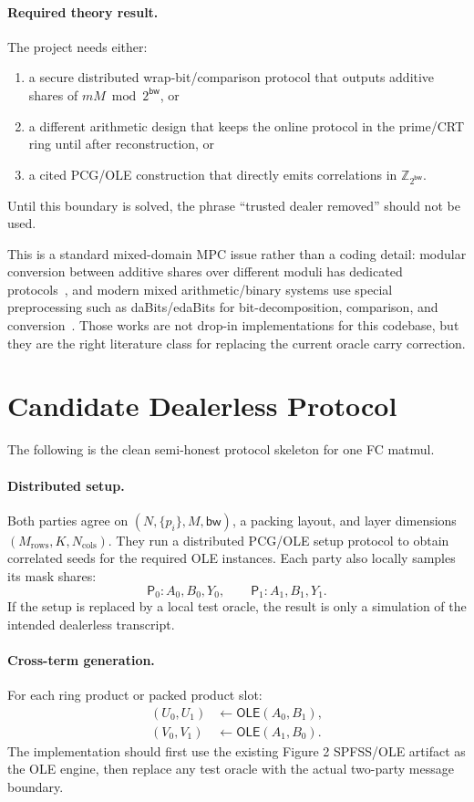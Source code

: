 \documentclass[11pt]{article}
\newcommand{\Z}{\mathbb{Z}}
\newcommand{\ServerZero}{\mathsf{P}_0}
\newcommand{\ServerOne}{\mathsf{P}_1}
\newcommand{\modtwo}{\Z_{2^{\mathsf{bw}}}}
\newcommand{\OLE}{\mathsf{OLE}}
\begin{document}
\paragraph{Required theory result.}
The project needs either:
\begin{enumerate}[leftmargin=*]
  \item a secure distributed wrap-bit/comparison protocol that outputs
  additive shares of \(mM \bmod 2^{\mathsf{bw}}\), or
  \item a different arithmetic design that keeps the online protocol in the
  prime/CRT ring until after reconstruction, or
  \item a cited PCG/OLE construction that directly emits correlations in
  \(\modtwo\).
\end{enumerate}
Until this boundary is solved, the phrase ``trusted dealer removed'' should
not be used.

This is a standard mixed-domain MPC issue rather than a coding detail:
modular conversion between additive shares over different moduli has dedicated
protocols~\cite{yu2011modcnv}, and modern mixed arithmetic/binary systems use
special preprocessing such as daBits/edaBits for bit-decomposition,
comparison, and conversion~\cite{escudero2020edabits}. Those works are not
drop-in implementations for this codebase, but they are the right literature
class for replacing the current oracle carry correction.

\section{Candidate Dealerless Protocol}

The following is the clean semi-honest protocol skeleton for one FC matmul.

\paragraph{Distributed setup.}
Both parties agree on \((N,\{p_i\},M,\mathsf{bw})\), a packing layout, and
layer dimensions \((M_{\mathrm{rows}},K,N_{\mathrm{cols}})\). They run a
distributed PCG/OLE setup protocol to obtain correlated seeds for the required
OLE instances. Each party also locally samples its mask shares:
\[
  \ServerZero: A_0,B_0,Y_0,\qquad
  \ServerOne: A_1,B_1,Y_1.
\]
If the setup is replaced by a local test oracle, the result is only a
simulation of the intended dealerless transcript.

\paragraph{Cross-term generation.}
For each ring product or packed product slot:
\[
\begin{aligned}
  (U_0,U_1) &\leftarrow \OLE(A_0,B_1),\\
  (V_0,V_1) &\leftarrow \OLE(A_1,B_0).
\end{aligned}
\]
The implementation should first use the existing Figure 2 SPFSS/OLE artifact
as the OLE engine, then replace any test oracle with the actual two-party
message boundary.
\end{document}
